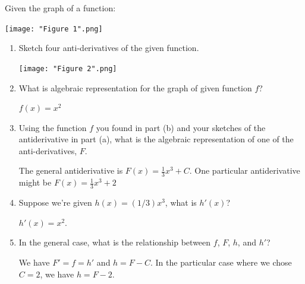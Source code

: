 \documentclass[nooutcomes]{ximera}
\begin{document}
	
	
	


\begin{problem}
  Given the graph of a function:
  \begin{image}
    \texttt{[image: "Figure 1".png]}
  \end{image}
  
  \begin{enumerate}
    \item
      Sketch four anti-derivatives of the given function.
      \begin{freeResponse} \hfil
        \begin{image}
          \texttt{[image: "Figure 2".png]}
        \end{image}
      \end{freeResponse}


    \item
      What is algebraic representation for the graph of given function $f$?
      \begin{freeResponse}
        $f(x) = x^2$
      \end{freeResponse}


    \item
      Using the function $f$ you found in part (b) and your sketches of the antiderivative in part (a), what is the algebraic representation of one of the anti-derivatives, $F$.
      \begin{freeResponse}
       The general antiderivative is $F(x) = \frac{1}{3}x^3+C$.  One particular antiderivative might be $F(x) = \frac{1}{3}x^3+2$
      \end{freeResponse}

    \item
      Suppose we're given $h(x) = (1/3)x^3$, what is $h'(x)$?
      \begin{freeResponse}
        $h'(x) = x^2$.
      \end{freeResponse}


    \item
      In the general case, what is the relationship between $f$, $F$, $h$, and $h'$?
      \begin{freeResponse}
        We have $F' = f = h'$ and $h = F-C$. In the particular case where we chose $C=2$, we have $h=F-2$.
      \end{freeResponse}
  \end{enumerate}
\end{problem}
\end{document}
